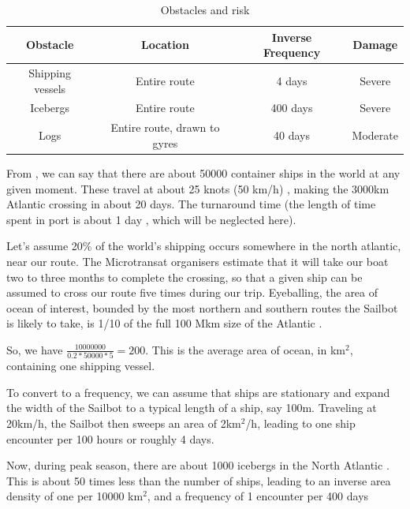 \begin{table}[h]
\caption{\label{tab:obstacles}Obstacles and risk}
\begin{tabular}{c|c|c|c}

Obstacle & Location & Inverse Frequency & Damage\\[0.6cm]
\hline

Shipping vessels & Entire route & 4 days & Severe \\
Icebergs & Entire route & 400 days & Severe \\
Logs & Entire route, drawn to gyres & 40 days & Moderate \\

\end{tabular}
\end{table}

From \cite{jallal__how-many-ships}, we can say that there are about 50000 container ships in the world at any given moment. These travel at about 25 knots (50 km/h) \cite{maersk__triple-e-class}, making the 3000km Atlantic crossing in about 20 days. The turnaround time (the length of time spent in port is about 1 day \cite{port-technology__global-turnaround-times}, which will be neglected here).

Let's assume 20\% of the world's shipping occurs somewhere in the north atlantic, near our route. The Microtransat organisers estimate that it will take our boat two to three months to complete the crossing, so that a given ship can be assumed to cross our route five times during our trip. Eyeballing, the area of ocean of interest, bounded by the most northern and southern routes the Sailbot is likely to take, is 1/10 of the full 100 Mkm size of the Atlantic \cite{worldatlas__atlantic-ocean}.

So, we have $\frac{10000000}{0.2*50000*5}=200$. This is the average area of ocean, in km$^2$, containing one shipping vessel.

To convert to a frequency, we can assume that ships are stationary and expand the width of the Sailbot to a typical length of a ship, say 100m. Traveling at 20km/h, the Sailbot then sweeps an area of 2km$^2$/h, leading to one ship encounter per 100 hours or roughly 4 days.

Now, during peak season, there are about 1000 icebergs in the North Atlantic \cite{natgeo__iceberg-frequency}. This is about 50 times less than the number of ships, leading to an inverse area density of one per 10000 km$^2$, and a frequency of 1 encounter per 400 days

\clearpage
\newpage
